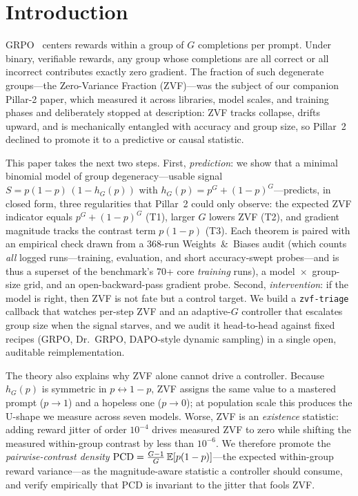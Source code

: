 \section{Introduction}
\label{sec:p7-intro}
GRPO~\citep{shao2024deepseekmath, guo2025deepseekr1} centers rewards within a
group of $G$ completions per prompt. Under binary, verifiable rewards, any
group whose completions are all correct or all incorrect contributes exactly
zero gradient. The fraction of such degenerate groups---the Zero-Variance
Fraction (ZVF)---was the subject of our companion Pillar-2 paper, which
measured it across libraries, model scales, and training phases and
deliberately stopped at description: ZVF tracks collapse, drifts upward, and
is mechanically entangled with accuracy and group size, so Pillar~2 declined
to promote it to a predictive or causal statistic.

This paper takes the next two steps. First, \emph{prediction}: we show that a
minimal binomial model of group degeneracy---usable signal
$S = p(1-p)\,(1 - h_G(p))$ with $h_G(p) = p^G + (1-p)^G$---predicts, in
closed form, three regularities that Pillar~2 could only observe: the
expected ZVF indicator equals $p^G + (1-p)^G$ (T1), larger $G$ lowers ZVF
(T2), and gradient magnitude tracks the contrast term $p(1-p)$ (T3). Each
theorem is paired with an empirical check drawn from a 368-run
Weights~\&~Biases audit (which counts \emph{all} logged runs---training,
evaluation, and short accuracy-swept probes---and is thus a superset of the
benchmark's 70+ core \emph{training} runs), a model~$\times$~group-size grid, and an
open-backward-pass gradient probe. Second, \emph{intervention}: if the model
is right, then ZVF is not fate but a control target. We build a
\texttt{zvf-triage} callback that watches per-step ZVF and an adaptive-$G$
controller that escalates group size when the signal starves, and we audit it
head-to-head against fixed recipes (GRPO, Dr.~GRPO, DAPO-style dynamic
sampling) in a single open, auditable reimplementation.

The theory also explains why ZVF alone cannot drive a controller. Because
$h_G(p)$ is symmetric in $p \leftrightarrow 1-p$, ZVF assigns the same value
to a mastered prompt ($p \to 1$) and a hopeless one ($p \to 0$); at
population scale this produces the U-shape we measure across seven models.
Worse, ZVF is an \emph{existence} statistic: adding reward jitter
of order $10^{-4}$ drives measured ZVF to zero while shifting the measured
within-group contrast by less than $10^{-6}$. We therefore promote the
\emph{pairwise-contrast density}
$\mathrm{PCD} = \frac{G-1}{G}\,\mathbb{E}[p(1-p)]$---the expected within-group reward
variance---as the magnitude-aware statistic a controller should consume, and
verify empirically that PCD is invariant to the jitter that fools ZVF.

